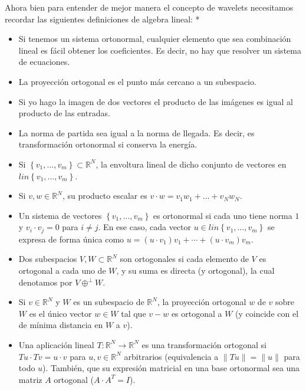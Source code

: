 \begin{paracol}{2}
Ahora bien para entender de mejor manera el concepto de wavelets necesitamos recordar las siguientes definiciones de algebra lineal:
\switchcolumn[1]*{\noindent\scriptsize
	\begin{itemize}
	    \item Si tenemos un sistema ortonormal, cualquier elemento que sea combinación lineal es fácil obtener los coeficientes. Es decir, no hay que resolver un sistema de ecuaciones.
	    \item La proyección ortogonal es el punto más cercano a un subespacio. 
	    \item Si yo hago la imagen de dos vectores el producto de las imágenes es igual al producto de las entradas. 
	    \item La norma de partida sea igual a la norma de llegada. Es decir, es transformación ortonormal si conserva la energía.
	\end{itemize}
}
\switchcolumn[0]
\begin{itemize}
    \item Si $\left\{v_1,\ldots,v_m\right\}\subset \mathbb{R}^N$, la envoltura lineal de dicho conjunto de vectores en $lin\left\{v_1,\ldots,v_m\right\}$.
    \item Si $v,w\in\mathbb{R}^N$, su producto escalar es $v\cdot w = v_1w_1+\ldots+v_Nw_N$.
    \item Un sistema de vectores $\left\{v_1,\ldots,v_m\right\}$ es ortonormal si cada uno tiene norma $1$ y $v_i\cdot v_j=0$ para $i\neq j$. En ese caso, cada vector $u\in lin\left\{v_1,\ldots,v_m\right\}$ se expresa de forma única como $u=(u\cdot v_1)v_1+\cdots + (u\cdot v_m)v_m$.
    \item Dos subespacios $V,W\subset \mathbb{R}^N$ son ortogonales si cada elemento de $V$ es ortogonal a cada uno de $W$, y su suma es directa (y ortogonal), la cual denotamos por $V\oplus^\perp W$.
    \item Si $v\in \mathbb{R}^N$ y $W$ es un subespacio de $\mathbb{R}^N$, la proyección ortogonal $w$ de $v$ sobre $W$ es el único vector $w\in W$ tal que $v-w$ es ortogonal a $W$ (y coincide con el de mínima distancia en $W$ a $v$).
    \item Una aplicación lineal $T:\mathbb{R}^N \to \mathbb{R}^N$ es una transformación ortogonal si $Tu\cdot Tv=u\cdot v$ para $u,v\in \mathbb{R}^N$ arbitrarios (equivalencia a $\|Tu\|=\|u\|$ para todo $u$). También, que su expresión matricial en una base ortonormal sea una matriz $A$ ortogonal ($A\cdot A^T=I$).
\end{itemize}


\end{paracol}
